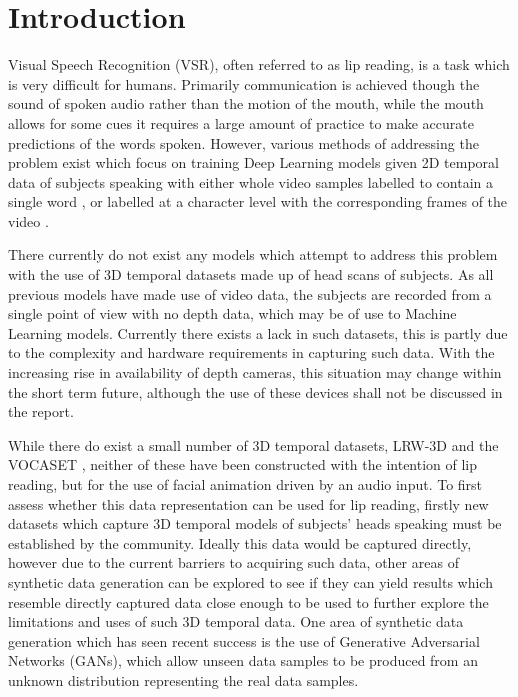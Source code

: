 \chapter{Introduction}

Visual Speech Recognition (VSR), often referred to as lip reading, is a task which is very difficult for humans.
Primarily communication is achieved though the sound of spoken audio rather than the motion of the mouth, while the mouth allows for some cues it requires a large amount of practice to make accurate predictions of the words spoken.
However, various methods of addressing the problem exist which focus on training Deep Learning models given 2D temporal data of subjects speaking with either whole video samples labelled to contain a single word \cite{Chung2016}, or labelled at a character level with the corresponding frames of the video \cite{Assael2016, Chung2017, Shillingford2018}.

There currently do not exist any models which attempt to address this problem with the use of 3D temporal datasets made up of head scans of subjects.
As all previous models have made use of video data, the subjects are recorded from a single point of view with no depth data, which may be of use to Machine Learning models.
Currently there exists a lack in such datasets, this is partly due to the complexity and hardware requirements in capturing such data. 
With the increasing rise in availability of depth cameras, this situation may change within the short term future, although the use of these devices shall not be discussed in the report.

While there do exist a small number of 3D temporal datasets, LRW-3D \cite{Tzirakis2019} and the VOCASET \cite{Cudeiro2019}, neither of these have been constructed with the intention of lip reading, but for the use of facial animation driven by an audio input.
To first assess whether this data representation can be used for lip reading, firstly new datasets which capture 3D temporal models of subjects' heads speaking must be established by the community.
Ideally this data would be captured directly, however due to the current barriers to acquiring such data, other areas of synthetic data generation can be explored to see if they can yield results which resemble directly captured data close enough to be used to further explore the limitations and uses of such 3D temporal data.
One area of synthetic data generation which has seen recent success is the use of Generative Adversarial Networks (GANs), which allow unseen data samples to be produced from an unknown distribution representing the real data samples.

